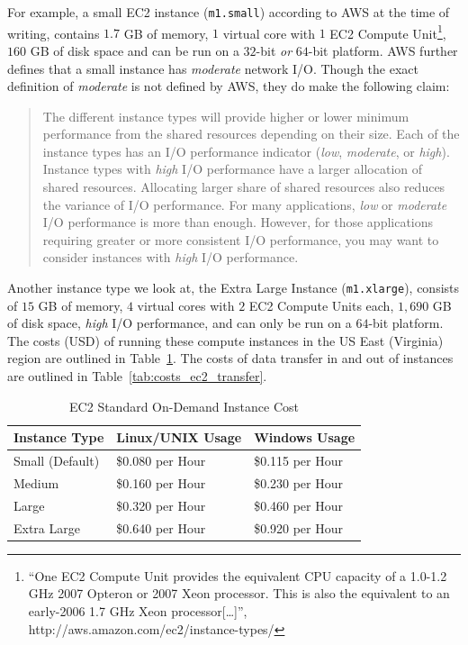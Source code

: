 For example, a small EC2 instance ({\tt m1.small}) according to
AWS\cite{amazonEC2InstanceTypes} at the time of writing, contains $1.7$ GB of
memory, $1$ virtual core with $1$ EC2 Compute Unit\footnote{``One EC2 Compute
  Unit provides the equivalent CPU capacity of a 1.0-1.2 GHz 2007 Opteron or
2007 Xeon processor. This is also the equivalent to an early-2006 1.7 GHz Xeon
processor[\ldots]'', http://aws.amazon.com/ec2/instance-types/}, $160$ GB of
disk space and can be run on a $32$-bit \emph{or} $64$-bit platform. AWS
further defines that a small instance has \emph{moderate} network I/O. Though
the exact definition of \emph{moderate} is not defined by AWS, they do make the
following claim\cite{amazonEC2InstanceTypes}:

\begin{quote}
  The different instance types will provide higher or lower minimum performance
  from the shared resources depending on their size. Each of the instance types
  has an I/O performance indicator (\emph{low}, \emph{moderate}, or
  \emph{high}). Instance types with \emph{high} I/O performance have a larger
  allocation of shared resources.  Allocating larger share of shared resources
  also reduces the variance of I/O performance. For many applications,
  \emph{low} or \emph{moderate} I/O performance is more than enough. However,
  for those applications requiring greater or more consistent I/O performance,
  you may want to consider instances with \emph{high} I/O performance.
\end{quote}

Another instance type we look at, the Extra Large Instance ({\tt m1.xlarge}),
consists of $15$ GB of memory, $4$ virtual cores with $2$ EC2 Compute Units
each, $1,690$ GB of disk space, \emph{high} I/O performance, and can only be
run on a $64$-bit platform. The costs (USD) of running these compute instances
in the US East (Virginia) region are outlined in
Table~\ref{tab:costs_ec2_instance}. The costs of data transfer in and out of
instances are outlined in Table~\ref{tab:costs_ec2_transfer}.

\begin{table}[htp]
  \begin{center}
    \begin{tabular}{|l|l l|}
      \hline
      \multicolumn{1}{|c}{\textbf{Instance Type}} &
      \multicolumn{1}{|c}{\textbf{Linux/UNIX Usage}} & 
      \multicolumn{1}{c|}{\textbf{Windows Usage}}\\
      \hline
          Small (Default) & \$0.080 per Hour & \$0.115 per Hour\\
                   Medium & \$0.160 per Hour & \$0.230 per Hour\\
                    Large & \$0.320 per Hour & \$0.460 per Hour\\
              Extra Large & \$0.640 per Hour & \$0.920 per Hour\\
      \hline
    \end{tabular}
    \caption{EC2 Standard On-Demand Instance Cost}
    \label{tab:costs_ec2_instance}
  \end{center}
\end{table}

